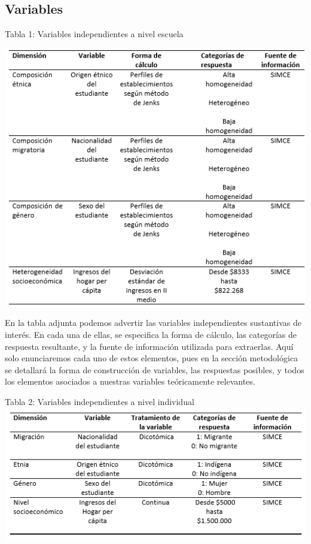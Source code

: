 \documentclass[
]{article}
\begin{document}
\hypertarget{variables}{%
\subsection{Variables}\label{variables}}

Tabla 1: Variables independientes a nivel escuela

\includegraphics{input/images/VI_ESCUELA.png}

En la tabla adjunta podemos advertir las variables independientes
sustantivas de interés. En cada una de ellas, se especifica la forma de
cálculo, las categorías de respuesta resultante, y la fuente de
información utilizada para extraerlas. Aquí solo enunciaremos cada uno
de estos elementos, pues en la sección metodológica se detallará la
forma de construcción de variables, las respuestas posibles, y todos los
elementos asociados a nuestras variables teóricamente relevantes.

Tabla 2: Variables independientes a nivel individual\\
\includegraphics{input/images/VI_INDIVIDUO.png}
\end{document}
